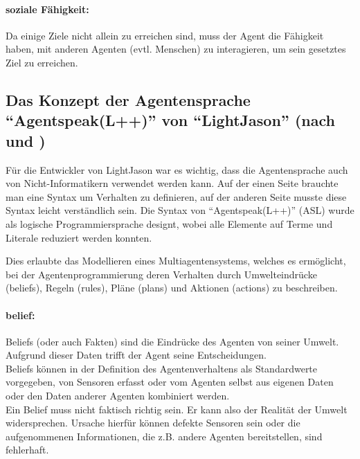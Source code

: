 \paragraph*{soziale Fähigkeit:} 
Da einige Ziele nicht allein zu erreichen sind, muss der Agent die Fähigkeit haben, mit anderen Agenten (evtl. Menschen) zu interagieren, um sein gesetztes Ziel zu erreichen.






\subsection[Das Konzept der Agentensprache \enquote{Agentspeak(L++)} von \enquote{LightJason}]{Das Konzept der Agentensprache \enquote{Agentspeak(L++)} von \enquote{LightJason} (nach \cite{lightjason} und \cite{lightjason-web})}
\label{sec:agentspeak}

Für die Entwickler von LightJason war es wichtig, dass die Agentensprache auch von Nicht-Informatikern verwendet werden kann.
Auf der einen Seite brauchte man eine Syntax um Verhalten zu definieren, auf der anderen Seite musste diese Syntax leicht verständlich %
sein.
Die Syntax von \enquote{Agentspeak(L++)} (ASL) wurde als logische Programmiersprache \mbox{designt}, wobei alle Elemente auf Terme und Literale reduziert werden konnten.

Dies erlaubte das Modellieren eines Multiagentensystems, welches es ermöglicht, bei der Agentenprogrammierung deren Verhalten durch Umwelteindrücke (beliefs), Regeln (rules), Pläne (plans) und Aktionen (actions) zu beschreiben.

\paragraph*{belief:}
Beliefs (oder auch Fakten) sind die Eindrücke des Agenten von seiner Umwelt.
Aufgrund dieser Daten trifft der Agent seine Entscheidungen.
\\
Beliefs können in der Definition des Agentenverhaltens als Standardwerte vorgegeben, von Sensoren erfasst oder vom Agenten selbst aus eigenen Daten oder den Daten anderer Agenten kombiniert werden.
\\
Ein Belief muss nicht faktisch richtig sein.
Er kann also der Realität der Umwelt widersprechen. 
Ursache hierfür können defekte Sensoren sein oder die aufgenommenen Informationen, die z.B. andere Agenten bereitstellen, sind fehlerhaft.

